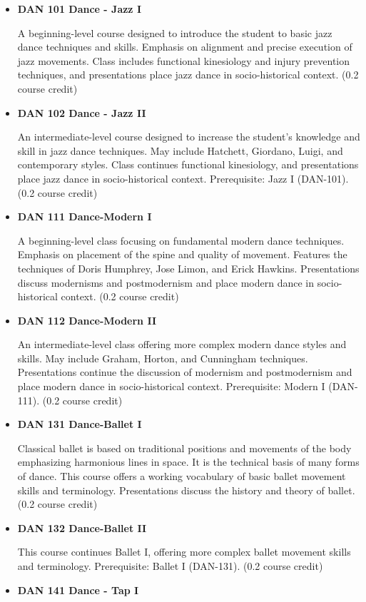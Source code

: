 \documentclass[
  letterpaper,
]{scrbook}
\begin{document}
\begin{itemize}
\item
  \textbf{DAN 101 Dance - Jazz I}

  A beginning-level course designed to introduce the student to basic
  jazz dance techniques and skills. Emphasis on alignment and precise
  execution of jazz movements. Class includes functional kinesiology and
  injury prevention techniques, and presentations place jazz dance in
  socio-historical context. (0.2 course credit)
\item
  \textbf{DAN 102 Dance - Jazz II}

  An intermediate-level course designed to increase the student's
  knowledge and skill in jazz dance techniques. May include Hatchett,
  Giordano, Luigi, and contemporary styles. Class continues functional
  kinesiology, and presentations place jazz dance in socio-historical
  context. Prerequisite: Jazz I (DAN-101). (0.2 course credit)
\item
  \textbf{DAN 111 Dance-Modern I}

  A beginning-level class focusing on fundamental modern dance
  techniques. Emphasis on placement of the spine and quality of
  movement. Features the techniques of Doris Humphrey, Jose Limon, and
  Erick Hawkins. Presentations discuss modernisms and postmodernism and
  place modern dance in socio-historical context. (0.2 course credit)
\item
  \textbf{DAN 112 Dance-Modern II}

  An intermediate-level class offering more complex modern dance styles
  and skills. May include Graham, Horton, and Cunningham techniques.
  Presentations continue the discussion of modernism and postmodernism
  and place modern dance in socio-historical context. Prerequisite:
  Modern I (DAN-111). (0.2 course credit)
\item
  \textbf{DAN 131 Dance-Ballet I}

  Classical ballet is based on traditional positions and movements of
  the body emphasizing harmonious lines in space. It is the technical
  basis of many forms of dance. This course offers a working vocabulary
  of basic ballet movement skills and terminology. Presentations discuss
  the history and theory of ballet. (0.2 course credit)
\item
  \textbf{DAN 132 Dance-Ballet II}

  This course continues Ballet I, offering more complex ballet movement
  skills and terminology. Prerequisite: Ballet I (DAN-131). (0.2 course
  credit)
\item
  \textbf{DAN 141 Dance - Tap I}


\end{itemize}
\end{document}
